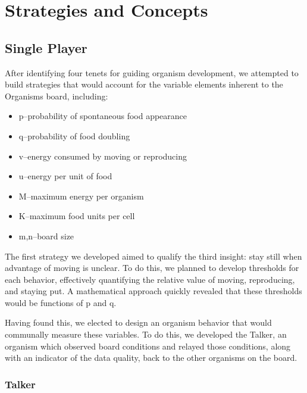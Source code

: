 \section{Strategies and Concepts}
\label{sec:strategies}

\subsection{Single Player}
After identifying four tenets for guiding organism development, we
attempted to build strategies that would account for the variable
elements inherent to the Organisms board, including:

\begin{itemize}
\item	p--probability of spontaneous food appearance
\item	q--probability of food doubling
\item	v--energy consumed by moving or reproducing
\item	u--energy per unit of food
\item	M--maximum energy per organism
\item	K--maximum food units per cell
\item	m,n--board size
\end{itemize}

The first strategy we developed aimed to qualify the third insight:
stay still when advantage of moving is unclear.  To do this, we
planned to develop thresholds for each behavior, effectively
quantifying the relative value of moving, reproducing, and staying
put.  A mathematical approach quickly revealed that these thresholds
would be functions of p and q.

Having found this, we elected to design an organism behavior that
would communally measure these variables.  To do this, we developed
the Talker, an organism which observed board conditions and relayed
those conditions, along with an indicator of the data quality, back to
the other organisms on the board.


\subsubsection{Talker}

